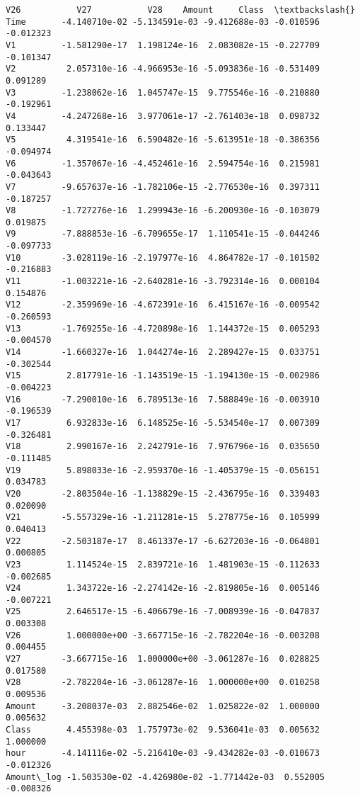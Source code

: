\documentclass[11pt]{article}
\begin{document}
\begin{tcolorbox}[breakable, size=fbox, boxrule=.5pt, pad at break*=1mm, opacityfill=0]
\begin{Verbatim}[commandchars=\\\{\}]
                     V26           V27           V28    Amount     Class  \textbackslash{}
Time       -4.140710e-02 -5.134591e-03 -9.412688e-03 -0.010596 -0.012323
V1         -1.581290e-17  1.198124e-16  2.083082e-15 -0.227709 -0.101347
V2          2.057310e-16 -4.966953e-16 -5.093836e-16 -0.531409  0.091289
V3         -1.238062e-16  1.045747e-15  9.775546e-16 -0.210880 -0.192961
V4         -4.247268e-16  3.977061e-17 -2.761403e-18  0.098732  0.133447
V5          4.319541e-16  6.590482e-16 -5.613951e-18 -0.386356 -0.094974
V6         -1.357067e-16 -4.452461e-16  2.594754e-16  0.215981 -0.043643
V7         -9.657637e-16 -1.782106e-15 -2.776530e-16  0.397311 -0.187257
V8         -1.727276e-16  1.299943e-16 -6.200930e-16 -0.103079  0.019875
V9         -7.888853e-16 -6.709655e-17  1.110541e-15 -0.044246 -0.097733
V10        -3.028119e-16 -2.197977e-16  4.864782e-17 -0.101502 -0.216883
V11        -1.003221e-16 -2.640281e-16 -3.792314e-16  0.000104  0.154876
V12        -2.359969e-16 -4.672391e-16  6.415167e-16 -0.009542 -0.260593
V13        -1.769255e-16 -4.720898e-16  1.144372e-15  0.005293 -0.004570
V14        -1.660327e-16  1.044274e-16  2.289427e-15  0.033751 -0.302544
V15         2.817791e-16 -1.143519e-15 -1.194130e-15 -0.002986 -0.004223
V16        -7.290010e-16  6.789513e-16  7.588849e-16 -0.003910 -0.196539
V17         6.932833e-16  6.148525e-16 -5.534540e-17  0.007309 -0.326481
V18         2.990167e-16  2.242791e-16  7.976796e-16  0.035650 -0.111485
V19         5.898033e-16 -2.959370e-16 -1.405379e-15 -0.056151  0.034783
V20        -2.803504e-16 -1.138829e-15 -2.436795e-16  0.339403  0.020090
V21        -5.557329e-16 -1.211281e-15  5.278775e-16  0.105999  0.040413
V22        -2.503187e-17  8.461337e-17 -6.627203e-16 -0.064801  0.000805
V23         1.114524e-15  2.839721e-16  1.481903e-15 -0.112633 -0.002685
V24         1.343722e-16 -2.274142e-16 -2.819805e-16  0.005146 -0.007221
V25         2.646517e-15 -6.406679e-16 -7.008939e-16 -0.047837  0.003308
V26         1.000000e+00 -3.667715e-16 -2.782204e-16 -0.003208  0.004455
V27        -3.667715e-16  1.000000e+00 -3.061287e-16  0.028825  0.017580
V28        -2.782204e-16 -3.061287e-16  1.000000e+00  0.010258  0.009536
Amount     -3.208037e-03  2.882546e-02  1.025822e-02  1.000000  0.005632
Class       4.455398e-03  1.757973e-02  9.536041e-03  0.005632  1.000000
hour       -4.141116e-02 -5.216410e-03 -9.434282e-03 -0.010673 -0.012326
Amount\_log -1.503530e-02 -4.426980e-02 -1.771442e-03  0.552005 -0.008326


\end{Verbatim}
\end{tcolorbox}
\end{document}

